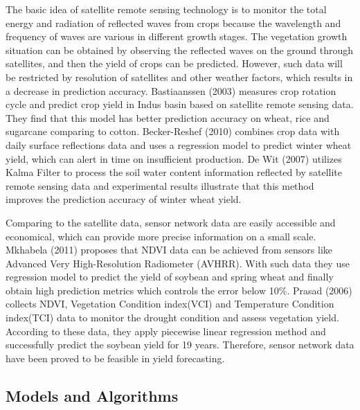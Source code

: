 \documentclass[conference, a4paper]{IEEEtran}
\begin{document}
    The basic idea of satellite remote sensing technology is to monitor the total energy and radiation of reflected waves from crops because the wavelength and frequency of waves are various in different growth stages. The vegetation growth situation can be obtained by observing the reﬂected waves on the ground through satellites, and then the yield of crops can be predicted. However, such data will be restricted by resolution of satellites and other weather factors, which results in a decrease in prediction accuracy. Bastiaanssen (2003) \cite{Bastiaanssen2003} measures crop rotation cycle and predict crop yield in Indus basin based on satellite remote sensing data. They ﬁnd that this model has better prediction accuracy on wheat, rice and sugarcane comparing to cotton. Becker-Reshef (2010)\cite{Becker-Reshef2010} combines crop data with daily surface reﬂections data and uses a regression model to predict winter wheat yield, which can alert in time on insufficient production. De Wit (2007) \cite{DeWit2007} utilizes Kalma Filter to process the soil water content information reﬂected by satellite remote sensing data and experimental results illustrate that this method improves the prediction accuracy of winter wheat yield.

    Comparing to the satellite data, sensor network data are easily accessible and economical, which can provide more precise information on a small scale. Mkhabela (2011)\cite{Mkhabela2011} proposes that NDVI data can be achieved from sensors like Advanced Very High-Resolution Radiometer (AVHRR). With such data they use regression model to predict the yield of soybean and spring wheat and finally obtain high prediction metrics which controls the error below 10\%. Prasad (2006) \cite{Prasad2006} collects NDVI, Vegetation Condition index(VCI) and Temperature Condition index(TCI) data to monitor the drought condition and assess vegetation yield. According to these data, they apply piecewise linear regression method and successfully predict the soybean yield for 19 years. Therefore, sensor network data have been proved to be feasible in yield forecasting.

  \subsection{Models and Algorithms}
\end{document}
